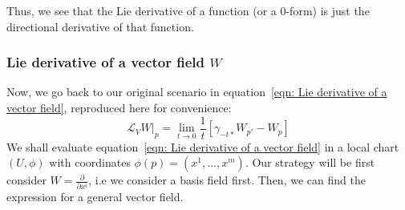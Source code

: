         Thus, we see that the Lie derivative of a function (or a 0-form) is
        just the directional derivative of that function.
      \subsubsection{Lie derivative of a vector field $W$}
        Now, we go back to our original scenario in equation~\ref{eqn: Lie
        derivative of a vector field}, reproduced here for convenience:
        \[\mathcal{L}_{V}W\bigr|_{p} = \lim_{t \rightarrow 0
        }\frac{1}{t}\left[\gamma_{-t*}W_{p'} - W_p\right]\]
        We shall evaluate equation~\ref{eqn: Lie derivative of a vector
        field} in a local chart $(U,\phi)$ with coordinates $\phi(p) =
        (x^1,...,x^m)$. Our strategy will be first consider $W =
        \frac{\partial}{\partial x^i}$, i.e we consider a basis field first.
        Then, we can find the expression for a general vector field.

